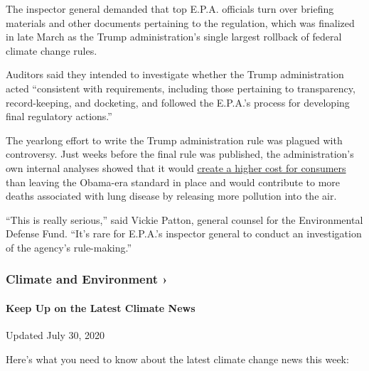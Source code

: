 The inspector general demanded that top E.P.A. officials turn over
briefing materials and other documents pertaining to the regulation,
which was finalized in late March as the Trump administration's single
largest rollback of federal climate change rules.

Auditors said they intended to investigate whether the Trump
administration acted ``consistent with requirements, including those
pertaining to transparency, record-keeping, and docketing, and followed
the E.P.A.'s process for developing final regulatory actions.''

The yearlong effort to write the Trump administration rule was plagued
with controversy. Just weeks before the final rule was published, the
administration's own internal analyses showed that it would
\href{https://www.nytimes3xbfgragh.onion/2020/02/13/climate/trump-fuel-economy-rollback.html}{create
a higher cost for consumers} than leaving the Obama-era standard in
place and would contribute to more deaths associated with lung disease
by releasing more pollution into the air.

``This is really serious,'' said Vickie Patton, general counsel for the
Environmental Defense Fund. ``It's rare for E.P.A.'s inspector general
to conduct an investigation of the agency's rule-making.''

\href{https://www.nytimes3xbfgragh.onion/section/climate?action=click\&pgtype=Article\&state=default\&region=MAIN_CONTENT_1\&context=storylines_keepup}{}

\hypertarget{climate-and-environment-}{%
\subsubsection{Climate and Environment
›}\label{climate-and-environment-}}

\hypertarget{keep-up-on-the-latest-climate-news}{%
\paragraph{Keep Up on the Latest Climate
News}\label{keep-up-on-the-latest-climate-news}}

Updated July 30, 2020

Here's what you need to know about the latest climate change news this
week:

